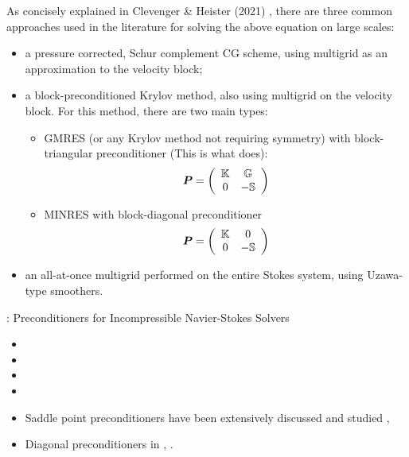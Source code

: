 As concisely explained in Clevenger \& Heister (2021) \cite{clhe21}, 
there are three common approaches used in the literature for solving the above equation on large scales:
\begin{itemize}
\item a pressure corrected, Schur complement CG scheme, using multigrid as an 
approximation to the velocity block;
\item a block-preconditioned Krylov
method, also using multigrid on the velocity block.
For this method, there are two main types:
\begin{itemize}
\item GMRES\cite{mabl15,rumi15} (or any Krylov method not requiring symmetry) with
block-triangular preconditioner (This is what \aspect does):
\[
{\bm P} = \left(
\begin{array}{cc}
{\mathbb{K}} & {\mathbb{G}} \\
0 & - {\mathbb{S}}
\end{array}
\right)
\]

\item MINRES\cite{gmhj16} with block-diagonal preconditioner
\[
{\bm P} = \left(
\begin{array}{cc}
{\mathbb{K}} & 0 \\
0 & - {\mathbb{S}}
\end{array}
\right)
\]

\end{itemize}

\item an all-at-once multigrid performed on the entire Stokes system, using Uzawa-type smoothers.
\end{itemize}



\Literature: Preconditioners for Incompressible Navier-Stokes Solvers 
\begin{small}
\begin{itemize}
\item {}
\item {}
\item {}
\item {}
\item Saddle point preconditioners have been extensively discussed and studied \cite{bewa08}, \cite{dewu04}
\item Diagonal preconditioners in \cite{shrb01}, \cite{babc94}.
\end{itemize}
\end{small}


